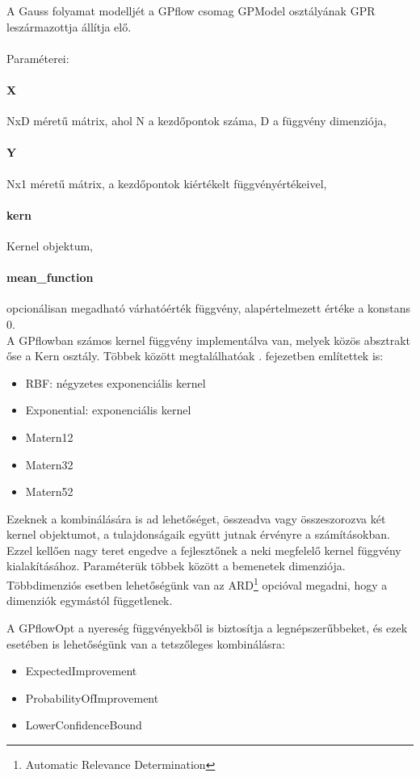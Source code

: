 A Gauss folyamat modelljét a GPflow csomag GPModel osztályának GPR leszármazottja állítja elő.\\\\
Paraméterei:
\paragraph{X} NxD méretű mátrix, ahol N a kezdőpontok száma, D a függvény dimenziója,\\
\paragraph{Y} Nx1 méretű mátrix, a kezdőpontok kiértékelt függvényértékeivel,\\
\paragraph{kern} Kernel objektum,\\
\paragraph{mean\_function} opcionálisan megadható várhatóérték függvény, alapértelmezett értéke a konstans 0.\\

A GPflowban számos kernel függvény implementálva van, melyek közös absztrakt őse a Kern osztály. Többek között megtalálhatóak . fejezetben említettek is:
\begin{itemize}
	\item RBF: négyzetes exponenciális kernel
	\item Exponential: exponenciális kernel
	\item Matern12
	\item Matern32
	\item Matern52
\end{itemize} 

Ezeknek a kombinálására is ad lehetőséget, összeadva vagy összeszorozva két kernel objektumot, a tulajdonságaik együtt jutnak érvényre a számításokban. Ezzel kellően nagy teret engedve a fejlesztőnek a neki megfelelő kernel függvény kialakításához. Paraméterük többek között a bemenetek dimenziója. Többdimenziós esetben lehetőségünk van az ARD\footnote{Automatic Relevance Determination} opcióval megadni, hogy a dimenziók egymástól függetlenek.

A GPflowOpt a nyereség függvényekből is biztosítja a legnépszerűbbeket, és ezek esetében is lehetőségünk van a tetszőleges kombinálásra:
\begin{itemize}
	\item ExpectedImprovement
	\item ProbabilityOfImprovement
	\item LowerConfidenceBound
\end{itemize}


